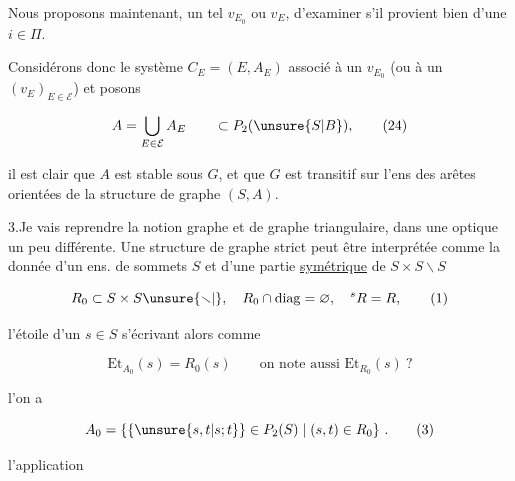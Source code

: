 Nous proposons maintenant,  un tel
$v_{E_0}$ ou $v_E$, d'examiner s'il provient bien
d'une  $i\in\Pi$.

Considérons donc le système 
$C_E=(E,A_E)$ associé à un $v_{E_0}$ (ou à un $(v_E)_{E\in\mathcal E}$)
et posons

\[
 A=\bigcup_{E\in\mathcal E} A_E\qquad\subset P_2(\unsure{S|B}), \tag*{(24)}
\]

il est clair que $A$ est stable sous $G$,
et que $G$ est transitif sur l'ens des
arêtes orientées de la structure de graphe $(S,A)$.


3.\quad Je vais reprendre la notion  graphe et de graphe triangulaire,
dans une optique un peu différente. Une structure
de graphe strict peut être interprétée comme la donnée
d'un  ens. de sommets $S$ et d'une partie
\uline{symétrique} de $S\times S\smallsetminus S$

\[
 R_0\subset S\times S\unsure{\smallsetminus|\vphantom{S}},\quad R_0\cap\mathrm{diag}=\varnothing,\quad{}^sR=R, \tag*{(1)}
\]

l'étoile d'un $s\in S$ s'écrivant alors comme

\[
 \mathrm{Et}_{A_0}(s)=R_0(s)\qquad \text{on note aussi }\mathrm{Et}_{R_0}(s)\ ? \tag*{(2)}
\]

 l'on a

\[
 A_0=\{\{\unsure{s,t|s;t}\}\in P_2(S)\mid(s,t)\in R_0\}\ . \tag*{(3)}
\]

  l'application


